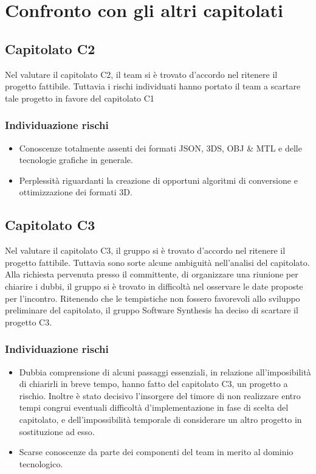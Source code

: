 \section{Confronto con gli altri capitolati}

\subsection{Capitolato C2}
Nel valutare il capitolato C2, il team si è trovato d'accordo nel ritenere il progetto fattibile. Tuttavia i rischi individuati hanno portato il team a scartare tale progetto in favore del capitolato C1

\subsubsection{Individuazione rischi}
\begin{itemize}
	\item Conoscenze totalmente assenti dei formati JSON, 3DS, OBJ \& MTL e delle tecnologie grafiche in generale.
	\item Perplessità riguardanti la creazione di opportuni algoritmi di conversione e ottimizzazione dei formati 3D.
\end{itemize}

\subsection{Capitolato C3}
Nel valutare il capitolato C3, il gruppo si è trovato d'accordo nel ritenere il progetto fattibile. Tuttavia sono sorte alcune ambiguità nell'analisi del capitolato. Alla richiesta pervenuta presso il committente, di organizzare una riunione per chiarire i dubbi, il gruppo si è trovato in difficoltà nel osservare le date proposte per l'incontro. Ritenendo che le tempistiche non fossero favorevoli allo sviluppo preliminare del capitolato, il gruppo Software Synthesis ha deciso di scartare il progetto C3.

\subsubsection{Individuazione rischi}
\begin{itemize}
	\item Dubbia comprensione di alcuni passaggi essenziali, in relazione all'imposibilità di chiarirli in breve tempo, hanno fatto del capitolato C3, un progetto a rischio. Inoltre è stato decisivo l'insorgere del timore di non realizzare entro tempi congrui eventuali difficoltà d'implementazione in fase di scelta del capitolato, e dell'impossibilità temporale di considerare un altro progetto in sostituzione ad esso.
	\item Scarse conoscenze da parte dei componenti del team in merito al dominio tecnologico.
\end{itemize}

